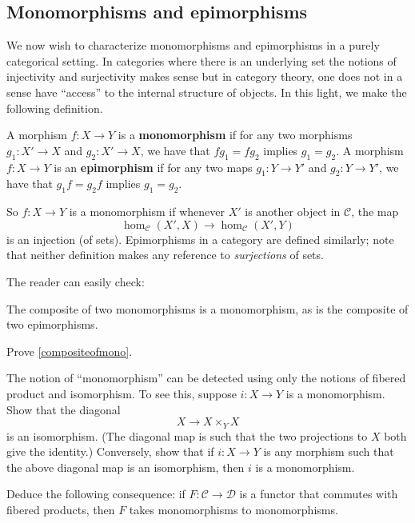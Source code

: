 \begin{proposition}
\subsection{Monomorphisms and epimorphisms}
We now wish to characterize monomorphisms and epimorphisms in a purely
categorical setting. In categories where there is an underlying set the notions
of injectivity and surjectivity makes sense but in category theory, one
does not
in a sense have ``access'' to the internal structure of objects. In this light,
we make the following definition.

\begin{definition}
A morphism $f:X \to Y$ is a \textbf{monomorphism} if for any two morphisms
$g_1:X'\rightarrow X$ and $g_2:X'\rightarrow X$, we have that $f g_1 = f g_2$
implies $g_1=g_2$. A morphism $f:X\rightarrow Y$ is an \textbf{epimorphism} if for any two
maps $g_1:Y\rightarrow Y'$ and $g_2:Y\rightarrow Y'$, we have that $g_1 f = g_2
f$ implies $g_1 = g_2$.
\end{definition}

So $f: X \to Y$ is a monomorphism if whenever $X'$ is another object in
$\mathcal{C}$, the map
\[ \hom_{\mathcal{C}}(X', X) \to \hom_{\mathcal{C}}(X', Y)  \]
is an injection (of sets). Epimorphisms in a category are defined similarly;
note that neither definition makes any reference to \emph{surjections} of sets.


The reader can easily check:

\begin{proposition}  \label{compositeofmono}
The composite of two monomorphisms is a monomorphism, as is the composite of
two epimorphisms.
\end{proposition} 

\begin{exercise} 
Prove \cref{compositeofmono}. 
\end{exercise} 


\begin{exercise} 
The notion of ``monomorphism'' can be detected using only the notions of
fibered product and isomorphism. To see this, suppose $i: X \to Y$ is a
monomorphism. Show that the diagonal
\[ X \to X \times_Y X  \]
is an isomorphism. (The diagonal map is such that the two
projections to $X$ both give the identity.) Conversely, show that if $i: X \to Y$ is any morphism such
that the above diagonal map is an isomorphism, then $i$ is a monomorphism.

Deduce the following consequence: if $F: \mathcal{C} \to \mathcal{D}$ is a
functor that commutes with fibered products, then $F $ takes monomorphisms to
monomorphisms.
\end{exercise} 



\end{proposition}
